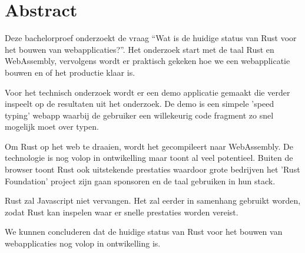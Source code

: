 \documentclass[11pt, oneside]{book}
\begin{document}
\clearpage

\chapter*{Abstract}
Deze bachelorproef onderzoekt de vraag \enquote{Wat is de huidige status van Rust voor het bouwen
van webapplicaties?}. Het onderzoek start met de taal Rust en WebAssembly, vervolgens wordt er 
praktisch gekeken hoe we een webapplicatie bouwen en of het productie klaar is.

Voor het technisch onderzoek wordt er een demo applicatie gemaakt die verder inspeelt op de
resultaten uit het onderzoek. De demo is een simpele 'speed typing' webapp waarbij de gebruiker een
willekeurig code fragment zo snel mogelijk moet over typen.

Om Rust op het web te draaien, wordt het gecompileert naar WebAssembly. De technologie is nog volop
in ontwikelling maar toont al veel potentieel. Buiten de browser toont Rust ook uitstekende
prestaties waardoor grote bedrijven het 'Rust Foundation' project zijn gaan sponsoren en de taal
gebruiken in hun stack.

Rust zal Javascript niet vervangen. Het zal eerder in samenhang gebruikt worden, zodat Rust kan
inspelen waar er snelle prestaties worden vereist.

We kunnen concluderen dat de huidige status van Rust voor het bouwen van webapplicaties nog volop in
ontwikelling is.

\tableofcontents

\listoffigures
{}

\printglossary[title=Lijst met afkortingen,toctitle=Lijst met afkortingen,type=acronym]

\clearpage

\printglossary[title=Verklarende woordenlijst,toctitle=Verklarende woordenlijst,type=main]
\glsaddallunused









\appendix



\end{document}
